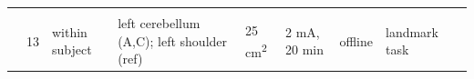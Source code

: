 \documentclass[11pt,english,]{memoir}
\begin{document}
\begin{longtable}[]{@{}lllllllll@{}}
\begin{minipage}[t]{0.02\columnwidth}
\strut
\end{minipage} & \begin{minipage}[t]{0.04\columnwidth}\raggedright
\strut
\end{minipage} & \begin{minipage}[t]{0.10\columnwidth}\raggedright
\strut
\end{minipage} & \begin{minipage}[t]{0.04\columnwidth}\raggedright
\strut
\end{minipage} & \begin{minipage}[t]{0.04\columnwidth}\raggedright
\strut
\end{minipage} & \begin{minipage}[t]{0.04\columnwidth}\raggedright
\strut
\end{minipage} & \begin{minipage}[t]{0.10\columnwidth}\raggedright
\strut
\end{minipage} & \begin{minipage}[t]{0.28\columnwidth}\raggedright
\strut
\end{minipage}\tabularnewline
\begin{minipage}[t]{0.09\columnwidth}\raggedright
\textcite{Picazio2015}\strut
\end{minipage} & \begin{minipage}[t]{0.02\columnwidth}\raggedright
13\strut
\end{minipage} & \begin{minipage}[t]{0.04\columnwidth}\raggedright
within
subject\strut
\end{minipage} & \begin{minipage}[t]{0.10\columnwidth}\raggedright
left cerebellum
(A,C); left shoulder
(ref)\strut
\end{minipage} & \begin{minipage}[t]{0.04\columnwidth}\raggedright
25
cm\textsuperscript{2}\strut
\end{minipage} & \begin{minipage}[t]{0.04\columnwidth}\raggedright
2 mA,
20 min\strut
\end{minipage} & \begin{minipage}[t]{0.04\columnwidth}\raggedright
offline\strut
\end{minipage} & \begin{minipage}[t]{0.10\columnwidth}\raggedright
landmark task\strut
\end{minipage} & \begin{minipage}[t]{0.28\columnwidth}\raggedright

\end{minipage}
\end{longtable}
\end{document}
